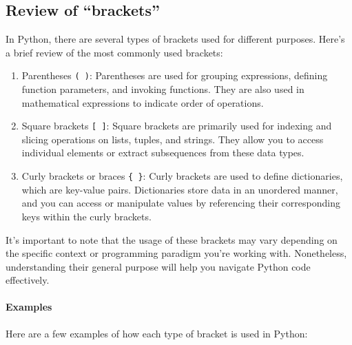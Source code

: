 \documentclass[
  letterpaper,
  DIV=11,
  numbers=noendperiod]{scrreprt}
\let\oldparagraph\paragraph
\renewcommand{\paragraph}[1]{\oldparagraph{#1}\mbox{}}
\begin{document}
\hypertarget{review-of-brackets}{%
\subsection{Review of ``brackets''}\label{review-of-brackets}}

In Python, there are several types of brackets used for different
purposes. Here's a brief review of the most commonly used brackets:

\begin{enumerate}
\def\labelenumi{\arabic{enumi}.}
\item
  Parentheses \texttt{(\ )}: Parentheses are used for grouping
  expressions, defining function parameters, and invoking functions.
  They are also used in mathematical expressions to indicate order of
  operations.
\item
  Square brackets \texttt{{[}\ {]}}: Square brackets are primarily used
  for indexing and slicing operations on lists, tuples, and strings.
  They allow you to access individual elements or extract subsequences
  from these data types.
\item
  Curly brackets or braces \texttt{\{\ \}}: Curly brackets are used to
  define dictionaries, which are key-value pairs. Dictionaries store
  data in an unordered manner, and you can access or manipulate values
  by referencing their corresponding keys within the curly brackets.
\end{enumerate}

It's important to note that the usage of these brackets may vary
depending on the specific context or programming paradigm you're working
with. Nonetheless, understanding their general purpose will help you
navigate Python code effectively.

\hypertarget{examples-1}{%
\paragraph{Examples}\label{examples-1}}

Here are a few examples of how each type of bracket is used in Python:
\end{document}
